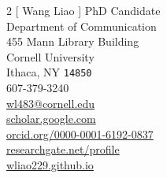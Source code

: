 \documentclass[11pt, letterpaper]{article} %
\begin{document}


\begin{multicols}{2}
[
{\LARGE Wang Liao} %
]
PhD Candidate\\
Department of Communication\\
455 Mann Library Building\\ %
Cornell University\\
Ithaca, NY \texttt{14850}\\

\columnbreak
{\tiny {}} 607-379-3240\\ %
{\tiny {}} \href{mailto:wl483@cornell.edu}{wl483@cornell.edu}\\ %
{\tiny {}} \href{https://scholar.google.com/citations?user=dH4uqKsAAAAJ}{scholar.google.com}\\
{\tiny {}} \href{http://orcid.org/0000-0001-6192-0837}{orcid.org/0000-0001-6192-0837}\\
{\tiny {}} \href{https://www.researchgate.net/profile/Wang_Liao}{researchgate.net/profile}\\
{\tiny {}} \href{https://wliao229.github.io}{wliao229.github.io}\\ %

\end{multicols}





\end{document}
